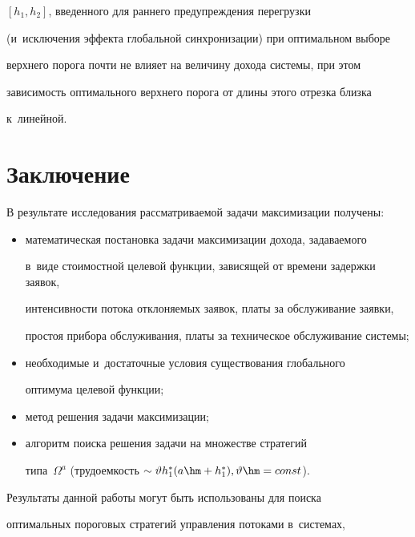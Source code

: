 $[h_1,h_2]$, введенного для раннего предупреждения перегрузки 


(и~исключения эффекта глобальной синхронизации) при оптимальном выборе 


верхнего порога почти не влияет на величину дохода системы, при этом 


зависимость оптимального верхнего порога от длины этого отрезка близка 


к~линейной.


  


  \section{Заключение}


  


  В результате исследования рассматриваемой задачи максимизации получены:


  \begin{itemize}


\item математическая постановка задачи максимизации дохода, задаваемого 


в~виде стоимостной целевой функции, зависящей от времени задержки заявок, 


интенсивности потока отклоняемых заявок, платы за обслуживание заявки, 


простоя прибора обслуживания, платы за техническое обслуживание системы;


\item необходимые и~достаточные условия существования глобального 


оптимума целевой функции;


\item метод решения задачи максимизации;


\item алгоритм поиска решения задачи на множестве стратегий 


типа~$\Omega^a$ (трудоемкость $\sim \vartheta h_1^*(a\hm+h_1^*), 


\vartheta\hm=const$). 


\end{itemize}





  Результаты данной работы могут быть использованы для поиска 


оптимальных пороговых стратегий управления потоками в~системах, 


